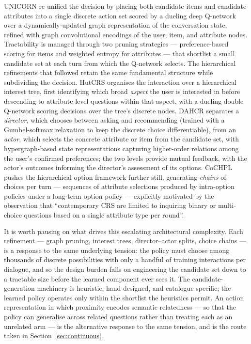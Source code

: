 UNICORN \citep{deng2021unified} re-unified the decision by placing both candidate items and candidate attributes into a single discrete action set scored by a dueling deep Q-network over a dynamically-updated graph representation of the conversation state, refined with graph convolutional encodings of the user, item, and attribute nodes. Tractability is managed through two pruning strategies — preference-based scoring for items and weighted entropy for attributes — that shortlist a small candidate set at each turn from which the Q-network selects. The hierarchical refinements that followed retain the same fundamental structure while subdividing the decision. HutCRS \citep{qian2023hutcrs} organises the interaction over a hierarchical interest tree, first identifying which broad \textit{aspect} the user is interested in before descending to attribute-level questions within that aspect, with a dueling double Q-network scoring decisions over the tree's discrete nodes. DAHCR \citep{zhao2023hierarchical} separates a \textit{director}, which chooses between asking and recommending (trained with a Gumbel-softmax relaxation to keep the discrete choice differentiable), from an \textit{actor}, which selects the concrete attribute or item from the candidate set, with hypergraph-based state representations capturing higher-order relations among the user's confirmed preferences; the two levels provide mutual feedback, with the actor's outcomes informing the director's assessment of its options. CoCHPL \citep{fan2024chain} pushes the hierarchical option framework further still, generating \textit{chains} of choices per turn — sequences of attribute selections produced by intra-option policies under a long-term option policy — explicitly motivated by the observation that ``contemporary CRS are limited to inquiring binary or multi-choice questions based on a single attribute type per round''.

It is worth pausing on what drives this escalating architectural complexity. Each refinement — graph pruning, interest trees, director--actor splits, choice chains — is a response to the same underlying tension: the policy must choose among thousands of discrete possibilities with only a handful of training interactions per dialogue, and so the design burden falls on engineering the candidate set down to a tractable size before the learned component ever sees it. The candidate-generation machinery is heuristic, hand-designed, and catalogue-specific; the learned policy operates only within the shortlist the heuristics permit. An action representation in which proximity encodes semantic relatedness — so that the policy can generalise across related questions rather than treating each as an unrelated arm — is the alternative response to the same tension, and is the route taken in Section~\ref{sec:continuous}.

